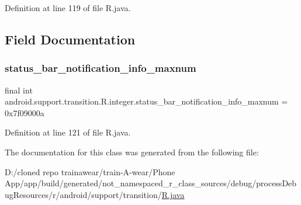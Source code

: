 Definition at line 119 of file R.\+java.


\begin{DoxyCode}{0}

\end{DoxyCode}


\subsection{Field Documentation}
\mbox{\label{classandroid_1_1support_1_1transition_1_1_r_1_1integer_a16b7d2020f81686d87ad20ae20652f64}} 
\subsubsection{\texorpdfstring{status\_bar\_notification\_info\_maxnum}{status\_bar\_notification\_info\_maxnum}}
{\footnotesize\ttfamily final int android.\+support.\+transition.\+R.\+integer.\+status\+\_\+bar\+\_\+notification\+\_\+info\+\_\+maxnum = 0x7f09000a\hspace{0.3cm}{\ttfamily [static]}}



Definition at line 121 of file R.\+java.



The documentation for this class was generated from the following file\+:\begin{DoxyCompactItemize}
\item 
D\+:/cloned repo trainawear/train-\/\+A-\/wear/\+Phone App/app/build/generated/not\+\_\+namespaced\+\_\+r\+\_\+class\+\_\+sources/debug/process\+Debug\+Resources/r/android/support/transition/\mbox{\hyperlink{process_debug_resources_2r_2android_2support_2transition_2_r_8java}{R.\+java}}\end{DoxyCompactItemize}
